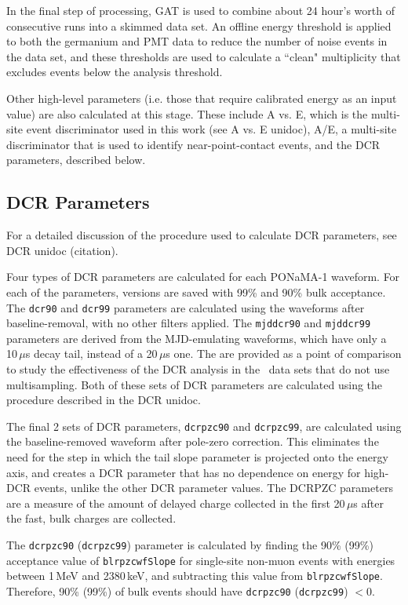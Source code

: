In the final step of processing, GAT is used to combine about 24 hour's worth of consecutive runs into a skimmed data set. An offline energy threshold is applied to both the germanium and PMT data to reduce the number of noise events in the data set, and these thresholds are used to calculate a ``clean" multiplicity that excludes events below the analysis threshold. 

Other high-level parameters (i.e. those that require calibrated energy as an input value) are also calculated at this stage. These include A vs. E, which is the multi-site event discriminator used in this work (see A vs. E unidoc), A/E, a multi-site discriminator that is used to identify near-point-contact events, and the DCR parameters, described below. 

\subsection{DCR Parameters}
For a detailed discussion of the procedure used to calculate DCR parameters, see DCR unidoc (citation). 

Four types of DCR parameters are calculated for each PONaMA-1 waveform. For each of the parameters, versions are saved with 99\% and 90\% bulk acceptance. The {\tt dcr90} and {\tt dcr99} parameters are calculated using the waveforms after baseline-removal, with no other filters applied. The {\tt mjddcr90} and {\tt mjddcr99} parameters are derived from the MJD-emulating waveforms, which have only a 10\,$\mu$s decay tail, instead of a 20\,$\mu$s one. The are provided as a point of comparison to study the effectiveness of the DCR analysis in the \MJ\ data sets that do not use multisampling. Both of these sets of DCR parameters are calculated using the procedure described in the DCR unidoc. 

The final 2 sets of DCR parameters, {\tt dcrpzc90} and {\tt dcrpzc99}, are calculated using the baseline-removed waveform after pole-zero correction. This eliminates the need for the step in which the tail slope parameter is projected onto the energy axis, and creates a DCR parameter that has no dependence on energy for high-DCR events, unlike the other DCR parameter values. The DCRPZC parameters are a measure of the amount of delayed charge collected in the first 20\,$\mu$s after the fast, bulk charges are collected. 

The {\tt dcrpzc90} ({\tt dcrpzc99}) parameter is calculated by finding the 90\% (99\%) acceptance value of {\tt blrpzcwfSlope} for single-site non-muon events with energies between 1\,MeV and 2380\,keV, and subtracting this value from {\tt blrpzcwfSlope}. Therefore, 90\% (99\%) of bulk events should have {\tt dcrpzc90} ({\tt dcrpzc99}) $< 0$.  

